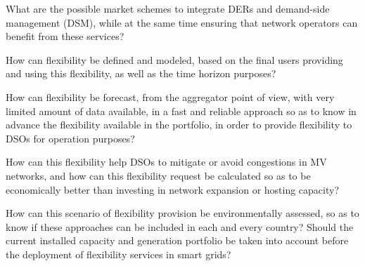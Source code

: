 \begin{tcolorbox}
\begin{RQ}
\item What are the possible market schemes to integrate DERs and demand-side management (DSM), while at the same time ensuring that network operators can benefit from these services?  
\item How can flexibility be defined and modeled, based on the final users providing and using this flexibility, as well as the time horizon purposes? 
\item How can flexibility be forecast, from the aggregator point of view, with very limited amount of data available, in a fast and reliable approach so as to know in advance the flexibility available in the portfolio, in order to provide flexibility to DSOs for operation purposes?
\item How can this flexibility help DSOs to mitigate or avoid congestions in MV networks, and how can this flexibility request be calculated so as to be economically better than investing in network expansion or hosting capacity?
\item How can this scenario of flexibility provision be environmentally assessed, so as to know if these approaches can be included in each and every country? Should the current installed capacity and generation portfolio be taken into account before the deployment of flexibility services in smart grids?
\end{RQ}
\end{tcolorbox}
\vspace*{2mm}


